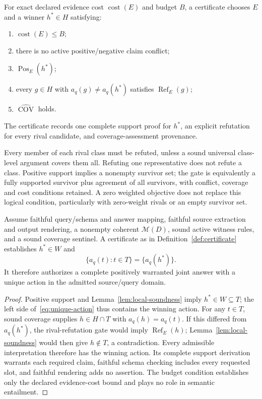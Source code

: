 \begin{definition}
\label{def:certificate}
For exact declared evidence cost $\operatorname{cost}(E)$ and budget $B$, a
certificate chooses $E$ and a winner $h^*\in H$ satisfying:
\begin{enumerate}
 \item $\operatorname{cost}(E)\le B$;
 \item there is no active positive/negative claim conflict;
 \item $\operatorname{Pos}_E(h^*)$;
 \item every $g\in H$ with $a_q(g)\ne a_q(h^*)$ satisfies
       $\operatorname{Ref}_E(g)$;
 \item $\widehat{\operatorname{COV}}$ holds.
\end{enumerate}
The certificate records one complete support proof for $h^*$, an explicit
refutation for every rival candidate, and coverage-assessment provenance.
\end{definition}
Every member of each rival class must be refuted, unless a sound universal
class-level argument covers them all. Refuting one representative does not
refute a class. Positive support implies a nonempty survivor set; the gate is
equivalently a fully supported survivor plus agreement of all survivors, with
conflict, coverage and cost conditions retained. A zero weighted objective
does not replace this logical condition, particularly with zero-weight rivals
or an empty survivor set.

\begin{theorem}
\label{thm:soundness}
Assume faithful query/schema and answer mapping, faithful source extraction
and output rendering, a nonempty coherent $\mathcal M(D)$, sound active witness
rules, and a sound coverage sentinel. A certificate as in
Definition~\ref{def:certificate} establishes $h^*\in W$ and
\begin{equation}
 \{a_q(t):t\in T\}=\{a_q(h^*)\}.
 \label{eq:unique-action}
\end{equation}
It therefore authorizes a complete positively warranted joint answer with a
unique action in the admitted source/query domain.
\end{theorem}
\begin{proof}
Positive support and Lemma~\ref{lem:local-soundness} imply $h^*\in W\subseteq T$;
the left side of~\eqref{eq:unique-action} thus contains the winning action.
For any $t\in T$, sound coverage supplies $h\in H\cap T$ with
$a_q(h)=a_q(t)$. If this differed from $a_q(h^*)$, the rival-refutation gate
would imply $\operatorname{Ref}_E(h)$; Lemma~\ref{lem:local-soundness} would then
give $h\notin T$, a contradiction. Every admissible interpretation therefore
has the winning action. Its complete support derivation warrants each required
claim, faithful schema checking includes every requested slot, and faithful
rendering adds no assertion. The budget condition establishes only the
declared evidence-cost bound and plays no role in semantic entailment.
\end{proof}

